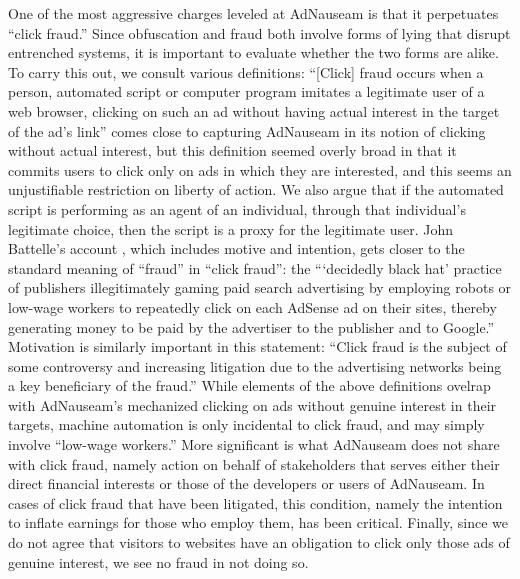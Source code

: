 \documentclass[conference]{IEEEtran}
\begin{document}
One of the most aggressive charges leveled at AdNauseam is that it perpetuates “click fraud.” Since obfuscation and fraud both involve forms of lying that disrupt entrenched systems, it is important to evaluate whether the two forms are alike.  To carry this out, we consult various definitions: “[Click] fraud occurs when a person, automated script or computer program imitates a legitimate user of a web browser, clicking on such an ad without having actual interest in the target of the ad's link” \cite{Liu} comes close to capturing AdNauseam in its notion of clicking without actual interest, but this definition seemed overly broad in that it commits users to click only on ads in which they are interested, and this seems an unjustifiable restriction on liberty of action. We also argue that if the automated script is performing as an agent of an individual, through that individual's legitimate choice, then the script is a proxy for the legitimate user. John Battelle's account \cite{Battelle}, which includes motive and intention, gets closer to the standard meaning of “fraud” in “click fraud”: the “‘decidedly black hat’ practice of publishers illegitimately gaming paid search advertising by employing robots or low-wage workers to repeatedly click on each AdSense ad on their sites, thereby generating money to be paid by the advertiser to the publisher and to Google.” Motivation is similarly important in this statement: “Click fraud is the subject of some controversy and increasing litigation due to the advertising networks being a key beneficiary of the fraud.” \cite{ClickFraud}
While elements of the above definitions ovelrap with AdNauseam's mechanized clicking on ads without genuine interest in their targets, machine automation is only incidental to click fraud, and may simply involve “low-wage workers.” More significant is what AdNauseam does not share with click fraud, namely action on behalf of stakeholders that serves either their direct financial interests or those of the developers or users of AdNauseam. In cases of click fraud that have been litigated, this condition, namely the intention to inflate earnings for those who employ them, has been critical. Finally, since we do not agree that visitors to websites have an obligation to click only those ads of genuine interest, we see no fraud in not doing so.
\end{document}
